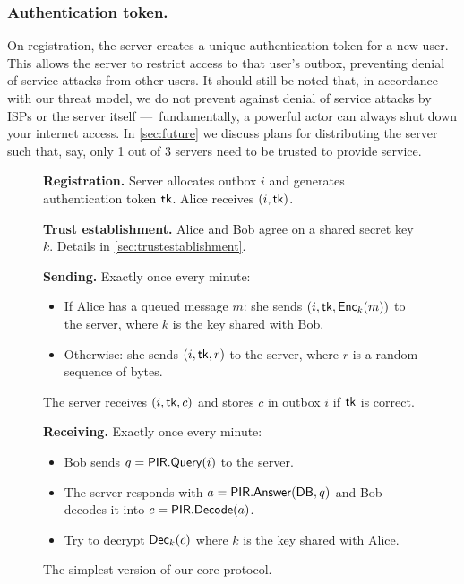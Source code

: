 \subsubsection{Authentication token.} 
On registration, the server creates a unique authentication token for a new user. This allows the server to restrict access to that user's outbox, preventing denial of service attacks from other users. It should still be noted that, in accordance with our threat model, we do not prevent against denial of service attacks by ISPs or the server itself — fundamentally, a powerful actor can always shut down your internet access. In \cref{sec:future} we discuss plans for distributing the server such that, say, only 1 out of 3 servers need to be trusted to provide service.

\begin{figure}
    \begin{framed}
    {\raggedright
        \small
    
    \begin{hangparas}{1em}{1}

        \textbf{Registration.}
            Server allocates outbox $i$ and generates authentication token $\authtoken$.
            Alice receives $(i, \authtoken)$.
    
    \medskip

        \textbf{Trust establishment.}
            Alice and Bob agree on a shared secret key $k$. Details in \cref{sec:trustestablishment}.

            \medskip

        \textbf{Sending.}
            Exactly once every minute: \begin{itemize}
                \item If Alice has a queued message $m$: she sends $(i, \authtoken, \enc_k(m))$ to the server, where $k$ is the key shared with Bob.
                \item Otherwise: she sends $(i, \authtoken, r)$ to the server, where $r$ is a random sequence of bytes.
            \end{itemize}
            The server receives $(i, \authtoken, c)$ and stores $c$ in outbox $i$ if $\authtoken$ is correct.

    \medskip

        
        \textbf{Receiving.} Exactly once every minute:
      \begin{itemize}
        \item Bob sends $q = \mathsf{PIR.Query}(i)$ to the server.
        \item The server responds with $a = \mathsf{PIR.Answer}(\mathsf{DB}, q)$ and Bob decodes it into $c = \mathsf{PIR.Decode}(a)$.
        \item Try to decrypt $\mathsf{Dec}_k(c)$ where $k$ is the key shared with Alice.
      \end{itemize}
    \end{hangparas}
    }
    \end{framed}
    \caption{The simplest version of our core protocol.}
    \label{fig:simple}
\end{figure}

